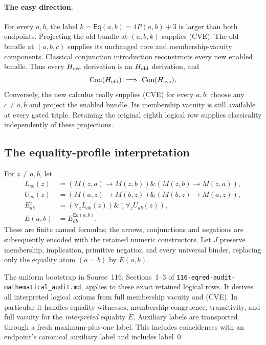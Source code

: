 \paragraph{The easy direction.}
For every $a,b$, the label
$k=\mathsf{Eq}(a,b)=4P(a,b)+3$ is larger than both endpoints.  Projecting
the old bundle at $(a,b,k)$ supplies (CVE).  The old bundle at $(a,b,c)$
supplies its unchanged core and membership-vacuity components.  Classical
conjunction introduction reconstructs every new enabled bundle.  Thus
every $H_{\rm cve}$ derivation is an $H_{\rm old}$ derivation, and
\[
 \operatorname{Con}(H_{\rm old})
 \ \Longrightarrow\ \operatorname{Con}(H_{\rm cve}).
\]
Conversely, the new calculus really supplies (CVE) for every $a,b$:
choose any $c\ne a,b$ and project the enabled bundle.  Its membership
vacuity is still available at every gated triple.  Retaining the original
eighth logical row supplies classicality independently of these projections.

\subsection{The equality-profile interpretation}

For $z\ne a,b$, let
\begin{align*}
 L_{ab}(z)&=(M(z,a)\to M(z,b))\mathbin{\&}
             (M(z,b)\to M(z,a)),\\
 U_{ab}(z)&=(M(a,z)\to M(b,z))\mathbin{\&}
             (M(b,z)\to M(a,z)),\\
 E_{ab}^{z}&=(\forall_z L_{ab}(z))\mathbin{\&}
             (\forall_z U_{ab}(z)),\\
 E(a,b)&=E_{ab}^{\mathsf{Eq}(a,b)}.
\end{align*}
These are finite named formulas; the arrows, conjunctions and negations
are subsequently encoded with the retained numeric constructors.
Let $J$ preserve membership, implication, primitive negation and every
universal binder, replacing only the equality atom $(a=b)$ by $E(a,b)$.

The uniform bootstrap in Source~116, Sections~1--3 of
\texttt{116-eqred-audit-mathematical\_audit.md}, applies to these exact
retained logical rows.  It derives all interpreted logical axioms from
full membership vacuity and (CVE).  In particular it handles equality
witnesses, membership congruence, transitivity, and full vacuity for the
\emph{interpreted} equality $E$.  Auxiliary labels are transported through
a fresh maximum-plus-one label.  This includes coincidences with an
endpoint's canonical auxiliary label and includes label~$0$.

